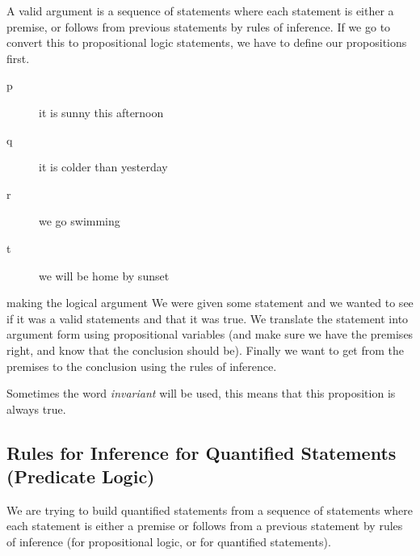 A valid argument is a sequence of statements where each statement is either a premise, or follows from previous statements by rules of inference.
If we go to convert this to propositional logic statements, we have to define our propositions first.
\begin{description}
    \item[p] it is sunny this afternoon
    \item[q] it is colder than yesterday
    \item[r] we go swimming
    \item[t] we will be home by sunset
\end{description}
making the logical argument
We were given some statement and we wanted to see if it was a valid statements and that it was true.
We translate the statement into argument form using propositional variables (and make sure we have the premises right, and know that the conclusion should be).
Finally we want to get from the premises to the conclusion using the rules of inference.

\begin{note}
    Sometimes the word \emph{invariant} will be used, this means that this proposition is always true.
\end{note}

\subsection{Rules for Inference for Quantified Statements (Predicate Logic)}\label{sub:rules_for_inference_for_quantified_statements_predicate_logic_}

We are trying to build quantified statements from a sequence of statements where each statement is either a premise or follows from a previous statement by rules of inference (for propositional logic, or for quantified statements).

